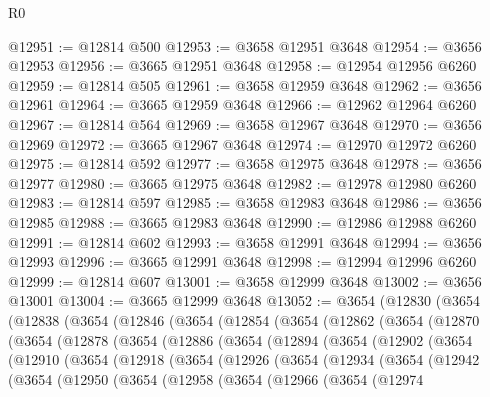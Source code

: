 \begin{lexlean}{R0}
\begin{coremodule}
@12951 := @12814 @500
@12953 := @3658 @12951 @3648
@12954 := @3656 @12953
@12956 := @3665 @12951 @3648
@12958 := @12954 @12956 @6260
@12959 := @12814 @505
@12961 := @3658 @12959 @3648
@12962 := @3656 @12961
@12964 := @3665 @12959 @3648
@12966 := @12962 @12964 @6260
@12967 := @12814 @564
@12969 := @3658 @12967 @3648
@12970 := @3656 @12969
@12972 := @3665 @12967 @3648
@12974 := @12970 @12972 @6260
@12975 := @12814 @592
@12977 := @3658 @12975 @3648
@12978 := @3656 @12977
@12980 := @3665 @12975 @3648
@12982 := @12978 @12980 @6260
@12983 := @12814 @597
@12985 := @3658 @12983 @3648
@12986 := @3656 @12985
@12988 := @3665 @12983 @3648
@12990 := @12986 @12988 @6260
@12991 := @12814 @602
@12993 := @3658 @12991 @3648
@12994 := @3656 @12993
@12996 := @3665 @12991 @3648
@12998 := @12994 @12996 @6260
@12999 := @12814 @607
@13001 := @3658 @12999 @3648
@13002 := @3656 @13001
@13004 := @3665 @12999 @3648
@13052 := @3654
    (@12830
      (@3654
        (@12838
          (@3654
            (@12846
              (@3654
                (@12854
                  (@3654
                    (@12862
                      (@3654
                        (@12870
                          (@3654
                            (@12878
                              (@3654
                                (@12886
                                  (@3654
                                    (@12894
                                      (@3654
                                        (@12902
                                          (@3654
                                            (@12910
                                              (@3654
                                                (@12918
                                                  (@3654
                                                    (@12926
                                                      (@3654
                                                        (@12934
                                                          (@3654
                                                            (@12942
                                                              (@3654
                                                                (@12950
                                                                  (@3654
                                                                    (@12958
                                                                      (@3654
                                                                        (@12966
                                                                          (@3654
                                                                            (@12974

\end{coremodule}
\end{lexlean}
